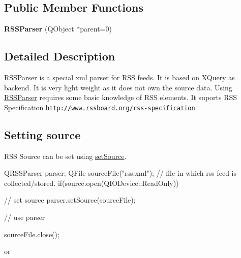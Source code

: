 \subsection*{Public Member Functions}
\begin{DoxyCompactItemize}
\item 
\hypertarget{class_r_s_s_parser_ac67372ef138fd40acfc22bcc3eee7133}{{\bfseries R\-S\-S\-Parser} (Q\-Object $\ast$parent=0)}\label{class_r_s_s_parser_ac67372ef138fd40acfc22bcc3eee7133}

\end{DoxyCompactItemize}


\subsection{Detailed Description}
\hyperlink{class_r_s_s_parser}{R\-S\-S\-Parser} is a special xml parser for R\-S\-S feeds. It is based on X\-Query as backend. It is very light weight as it does not own the source data. Using \hyperlink{class_r_s_s_parser}{R\-S\-S\-Parser} requires some basic knowledge of R\-S\-S elements. It suports R\-S\-S Specification \href{http://www.rssboard.org/rss-specification}{\tt http\-://www.\-rssboard.\-org/rss-\/specification}. 

\hypertarget{class_r_s_s_parser_source}{}\subsection{Setting source}\label{class_r_s_s_parser_source}
R\-S\-S Source can be set using \hyperlink{class_r_s_s_parser_a61ed20107ba616368c053eb61a99ba9d}{set\-Source}.


\begin{DoxyCode}
    QRSSParser parser;
    QFile sourceFile("rss.xml"); // file in which rss feed is collected/stored.
    if(source.open(QIODevice::ReadOnly))
    {
       // set source
       parser.setSource(sourceFile);

       // use parser
    }
    sourceFile.close();
\end{DoxyCode}


\par
 or

